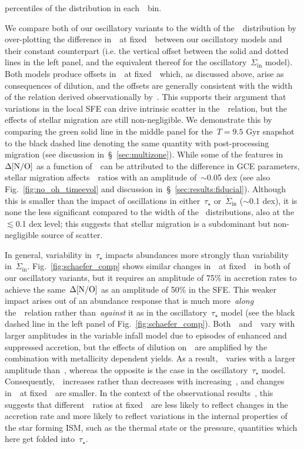 \documentclass[ms.tex]{subfiles}
\begin{document}
percentiles of the distribution in each~\oh~bin.
\par
We compare both of our oscillatory variants to the width of the~\no~distribution
by over-plotting the difference in~\no~at fixed~\oh~between our oscillatory
models and their constant counterpart (i.e. the vertical offset between the
solid and dotted lines in the left panel, and the equivalent thereof for the
oscillatory~$\dot{\Sigma}_\text{in}$ model).
Both models produce offsets in~\no~at fixed~\oh~which, as discussed above,
arise as consequences of dilution, and the offsets are generally consistent
with the width of the relation derived observationally by~\citet{Schaefer2020}.
This supports their argument that variations in the local SFE can drive
intrinsic scatter in the~\ohno~relation, but the effects of stellar migration
are still non-negligible.
We demonstrate this by comparing the green solid line in the middle panel for
the~$T = 9.5$ Gyr snapshot to the black dashed line denoting the same quantity
with post-processing migration (see discussion in~\S~\ref{sec:multizone}).
While some of the features in~$\Delta\text{[N/O]}$ as a function of~\oh~can be
attributed to the difference in GCE parameters, stellar migration
affects~\no~ratios with an amplitude of~$\sim$0.05 dex (see also
Fig.~\ref{fig:no_oh_timeevol} and discussion in~\S~\ref{sec:results:fiducial}).
Although this is smaller than the impact of oscillations in either~$\tau_\star$
or~$\dot{\Sigma}_\text{in}$ ($\sim$0.1 dex), it is none the less significant
compared to the width of the~\citet{Schaefer2020} distributions, also at
the~$\lesssim$0.1 dex level; this suggests that stellar migration is a
subdominant but non-negligible source of scatter.
\par
In general, variability in~$\tau_\star$ impacts abundances more strongly than
variability in~$\dot{\Sigma}_\text{in}$.
Fig.~\ref{fig:schaefer_comp} shows similar changes in~\no~at fixed~\oh~in both
of our oscillatory variants, but it requires an amplitude of 75\% in accretion
rates to achieve the same~$\Delta\text{[N/O]}$ as an amplitude of 50\% in the SFE.
This weaker impact arises out of an abundance response that is much
more~\textit{along} the~\ohno~relation rather than~\textit{against} it as in the
oscillatory~$\tau_\star$ model (see the black dashed line in the left panel of
Fig.~\ref{fig:schaefer_comp}).
Both~\oh~and~\nh~vary with larger amplitudes in the variable infall model due to
episodes of enhanced and suppressed accretion, but the effects of dilution
on~\nh~are amplified by the combination with metallicity dependent yields.
As a result,~\nh~varies with a larger amplitude than~\oh, whereas the opposite
is the case in the oscillatory~$\tau_\star$ model.
Consequently,~\no~increases rather than decreases with increasing~\oh, and
changes in~\no~at fixed~\oh~are smaller.
In the context of the observational results~\citep{Schaefer2020}, this suggests
that different~\no~ratios at fixed~\oh~are less likely to reflect changes in
the accretion rate and more likely to reflect variations in the internal
properties of the star forming ISM, such as the thermal state or the pressure,
quantities which here get folded into~$\tau_\star$.
\end{document}
